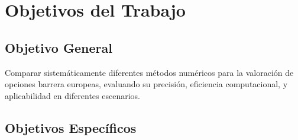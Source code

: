 \section{Objetivos del Trabajo}

\subsection{Objetivo General}

Comparar sistemáticamente diferentes métodos numéricos para la valoración de opciones barrera europeas, evaluando su precisión, eficiencia computacional, y aplicabilidad en diferentes escenarios.

\subsection{Objetivos Específicos}

